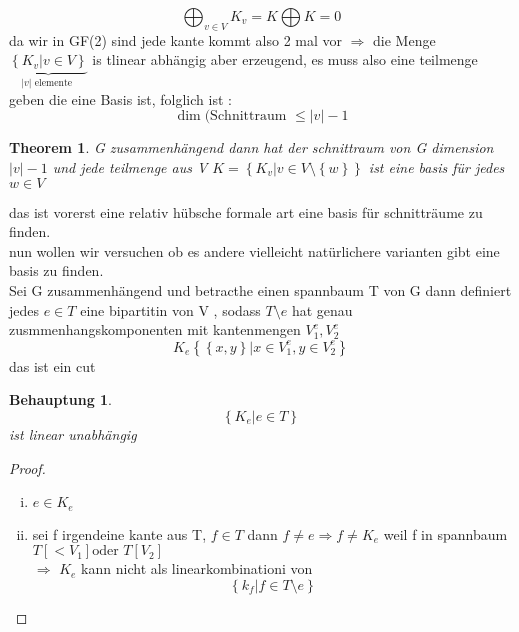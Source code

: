 \documentclass[a4paper]{article}
\newtheorem{theorem}{Theorem}[section]
\newtheorem{behauptung}{Behauptung}
\theoremstyle{definition}
\theoremstyle{remark}
\begin{document}
\begin{equation*}
  \bigoplus_{v\in V}K_v= K \bigoplus K = 0
\end{equation*}
da wir in GF(2) sind 
jede kante kommt also 2 mal vor 
$\Rightarrow$ die Menge $ \underbrace{\left\{ K_v|v\in V \right\}}_{|v| \textrm{ elemente }}$ is tlinear abhängig aber erzeugend, es muss also eine teilmenge geben die eine Basis ist, folglich ist :
\begin{equation*}
  \dim(\textrm{Schnittraum }\leq |v| -1
\end{equation*}
\begin{theorem}
  G zusammenhängend dann hat der schnittraum von G dimension $|v|-1$ und jede teilmenge aus V $ K= \left\{ K_v | v\in V\setminus \left\{ w \right\} \right\}$ ist eine basis für jedes $w \in V$
\end{theorem}
das ist vorerst eine relativ hübsche formale art eine basis für schnitträume zu finden.\\
nun wollen wir versuchen ob es andere vielleicht natürlichere varianten gibt eine basis zu finden.\\
Sei G zusammenhängend und betracthe einen spannbaum T von G dann definiert jedes $e\in T$ eine bipartitin von V , sodass  $ T \setminus e$ hat genau zusmmenhangskomponenten mit kantenmengen $ V_1^e, V_2^e$ 
\begin{equation*}
  K_e\left\{ \left\{ x,y \right\}|x\in V_1^e,y\in V_2^e \right\}
\end{equation*}
das ist ein cut\\
\begin{behauptung}
  \begin{equation*}
    \left\{ K_e | e\in T \right\}
  \end{equation*}
  ist linear unabhängig
\end{behauptung}
\begin{proof}
  \begin{enumerate}[(i)]
    \item $ e \in K_e$
    \item sei f irgendeine kante aus T, $f\in T$ dann $f\neq e \Rightarrow f \neq K_e$ weil f in spannbaum $T\left[ <V_1 \right] \textrm{oder } T\left[ V_2 \right]$ \\
      $ \Rightarrow $ $K_e$ kann nicht als linearkombinationi von 
      \begin{equation*}
	\left\{ k_f|f\in T\setminus e \right\}
      \end{equation*}
  \end{enumerate}
\end{proof}
\end{document}
